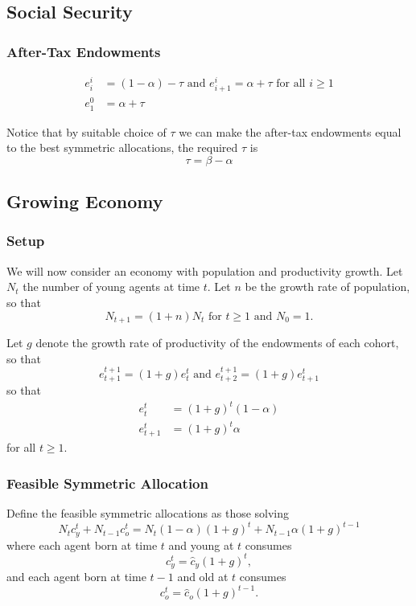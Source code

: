 \documentclass[10pt]{article}
\begin{document}
\subsection{Social Security}

\subsubsection{After-Tax Endowments}

\begin{align}
    e_i^i & =(1-\alpha)-\tau \text { and } e_{i+1}^i=\alpha+\tau \text { for all } i \geq 1 \\
    e_1^0 & =\alpha+\tau
\end{align}

Notice that by suitable choice of $\tau$ we can make the after-tax endowments equal to the best symmetric allocations, the required $\tau$ is
$$
\tau=\beta-\alpha
$$

\subsection{Growing Economy}

\subsubsection{Setup}

We will now consider an economy with population and productivity growth. Let $N_t$ the number of young agents at time $t$. Let $n$ be the growth rate of population, so that
$$
N_{t+1}=(1+n) N_t \text { for } t \geq 1 \text { and } N_0=1 .
$$

Let $g$ denote the growth rate of productivity of the endowments of each cohort, so that
$$
e_{t+1}^{t+1}=(1+g) e_t^t \text { and } e_{t+2}^{t+1}=(1+g) e_{t+1}^t
$$
so that
$$
\begin{aligned}
e_t^t & =(1+g)^t(1-\alpha) \\
e_{t+1}^t & =(1+g)^t \alpha
\end{aligned}
$$
for all $t \geq 1$.

\subsubsection{Feasible Symmetric Allocation}


Define the feasible symmetric allocations as those solving
$$
N_t c_y^t+N_{t-1} c_o^t=N_t(1-\alpha)(1+g)^t+N_{t-1} \alpha(1+g)^{t-1}
$$
where each agent born at time $t$ and young at $t$ consumes
$$
c_y^t=\hat{c}_y(1+g)^t,
$$
and each agent born at time $t-1$ and old at $t$ consumes
$$
c_o^t=\hat{c}_o(1+g)^{t-1} .
$$
\end{document}

